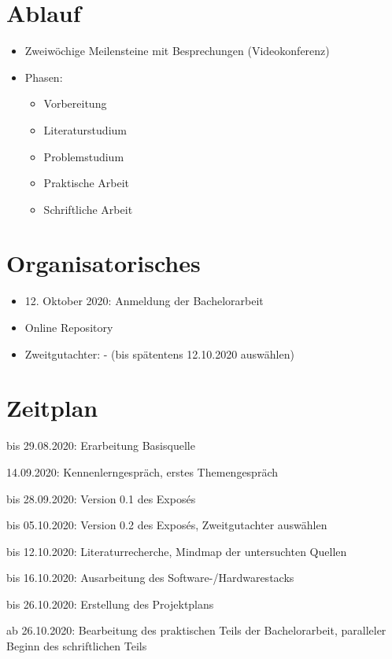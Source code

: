 \documentclass[11pt]{article}
\newcommand{\cmark}{\ding{51}}%
\newcommand{\done}{\rlap{$\square$}{\raisebox{2pt}{\large\hspace{1pt}\cmark}}%
\hspace{-2.5pt}}
\begin{document}
    \section{Ablauf}
    \begin{itemize}
        \item Zweiwöchige Meilensteine mit Besprechungen (Videokonferenz)
        \item Phasen:
        \begin{itemize}
            \item Vorbereitung
            \item Literaturstudium
            \item Problemstudium
            \item Praktische Arbeit
            \item Schriftliche Arbeit
        \end{itemize}
    \end{itemize}

    \section{Organisatorisches}
    \begin{itemize}
        \item 12. Oktober 2020: Anmeldung der Bachelorarbeit
        \item Online Repository~\cite{github}
        \item Zweitgutachter: - (bis spätentens 12.10.2020 auswählen)
    \end{itemize}

    \section{Zeitplan}
    \begin{todolist}
        \item[\done] bis 29.08.2020: Erarbeitung Basisquelle
        \item[\done] 14.09.2020: Kennenlerngespräch, erstes Themengespräch
        \item[\done] bis 28.09.2020: Version 0.1 des Exposés
        \item bis 05.10.2020: Version 0.2 des Exposés, Zweitgutachter auswählen
        \item bis 12.10.2020: Literaturrecherche, Mindmap der untersuchten Quellen
        \item bis 16.10.2020: Ausarbeitung des Software-/Hardwarestacks
        \item bis 26.10.2020: Erstellung des Projektplans
        \item ab 26.10.2020: Bearbeitung des praktischen Teils der Bachelorarbeit, paralleler Beginn des
        schriftlichen Teils
    \end{todolist}

    \newpage

    \listoffigures

    ~\nocite{*}
    
    
\end{document}
